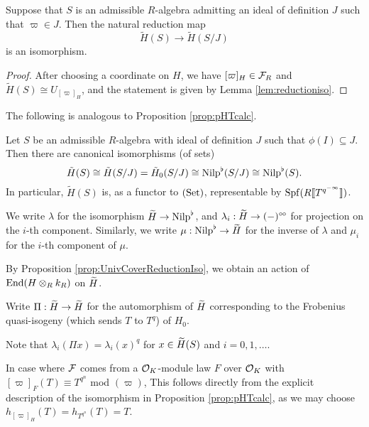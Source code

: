 \documentclass[../main.tex]{subfiles}
\begin{document}
\begin{lem}
  Suppose that $S$ is an admissible $R$-algebra admitting an ideal of definition
  $J$ such that $\varpi \in J$. Then the natural reduction map
  \begin{equation*}
    \tilde H(S) \to \tilde H(S/J)
  \end{equation*}
  is an isomorphism.
  \begin{proof}[Proof]
    After choosing a coordinate on $H$, we have $[\varpi]_H \in \cF_R$ and 
    $\tilde H(S) \cong U_{[\varpi]_H}$, and the statement is given by 
    Lemma \ref{lem:reductioniso}.
  \end{proof}
\end{lem}

The following is analogous to Proposition \ref{prop:pHTcalc}.
\begin{prop}\label{prop:UnivCoverReductionIso}
  Let $S$ be an admissible $R$-algebra with ideal of definition $J$ such that 
  $\phi(I) \subseteq J$. Then there are canonical isomorphisms (of sets)
  \begin{equation*}
    \tilde H(S) \cong \tilde H(S/J) = \tilde H_0(S/J) \cong \Nilp^\flat(S/J) \cong
    \Nilp^\flat(S).
  \end{equation*}
  In particular, $\tilde H(S)$ is, as a functor to $\Set$, representable by
  $\spf(R \llbr T^{q^{-\infty}} \rrbr)$.
\end{prop}
We write $\lambda$ for the isomorphism $\Tilde H \to \Nilp^\flat$, and
$\lambda_i: \Tilde H \to (-)^\cici$ for projection on the $i$-th component.
Similarly, we write $\mu: \Nilp^\flat \to \Tilde H$ for the inverse of 
$\lambda$ and $\mu_i$ for the $i$-th component of $\mu$. 

By Proposition \ref{prop:UnivCoverReductionIso}, we obtain an action of 
$\End(H \otimes_R k_R)$ on $\Tilde H$.

\begin{defi} \label{def:FrobOnUnivCov}
  Write $\Pi: \Tilde H \to \Tilde H$ for the automorphism of $\Tilde H$ corresponding
  to the Frobenius quasi-isogeny (which sends $T$ to $T^q$) of $H_0$.
\end{defi}

Note that $\lambda_i(\Pi x) = \lambda_i(x)^q$ for $x \in \Tilde H(S)$ and 
$i=0,1,\dots$. 

\begin{rmk} 
  In case where $\cF$ comes from a $\cO_K$-module law $F$ over 
  $\cO_K$ with $[\varpi]_F(T) \equiv T^{q^n}$ mod $(\varpi)$,
    This follows directly from the explicit description of the isomorphism in
  Proposition \ref{prop:pHTcalc}, as we may choose $h_{[\varpi]_H}(T) = h_{T^{q^n}}(T)
  = T$.
\end{rmk}
\end{document}
